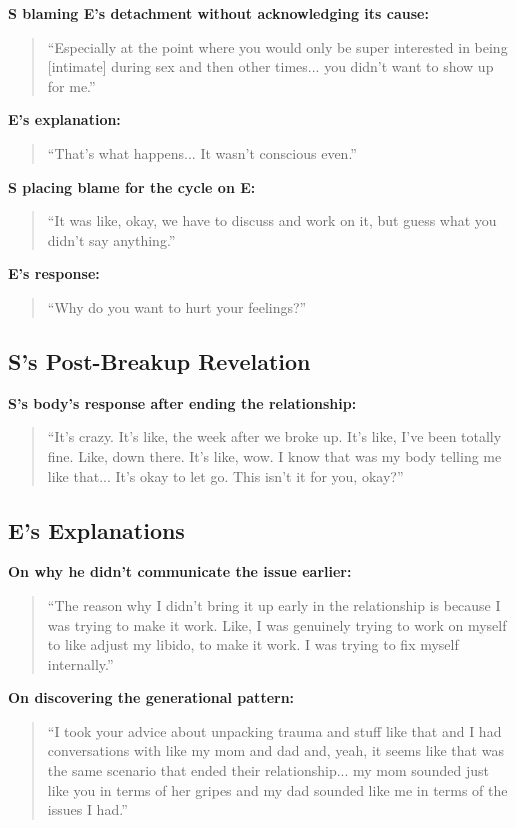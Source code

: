 \documentclass[12pt, letterpaper]{article}
\begin{document}
\textbf{S blaming E's detachment without acknowledging its cause:}
\begin{quote}
``Especially at the point where you would only be super interested in being [intimate] during sex and then other times... you didn't want to show up for me.''
\end{quote}

\textbf{E's explanation:}
\begin{quote}
``That's what happens... It wasn't conscious even.''
\end{quote}

\textbf{S placing blame for the cycle on E:}
\begin{quote}
``It was like, okay, we have to discuss and work on it, but guess what you didn't say anything.''
\end{quote}

\textbf{E's response:}
\begin{quote}
``Why do you want to hurt your feelings?''
\end{quote}

\subsection{S's Post-Breakup Revelation}

\textbf{S's body's response after ending the relationship:}
\begin{quote}
``It's crazy. It's like, the week after we broke up. It's like, I've been totally fine. Like, down there. It's like, wow. I know that was my body telling me like that... It's okay to let go. This isn't it for you, okay?''
\end{quote}

\subsection{E's Explanations}

\textbf{On why he didn't communicate the issue earlier:}
\begin{quote}
``The reason why I didn't bring it up early in the relationship is because I was trying to make it work. Like, I was genuinely trying to work on myself to like adjust my libido, to make it work. I was trying to fix myself internally.''
\end{quote}

\textbf{On discovering the generational pattern:}
\begin{quote}
``I took your advice about unpacking trauma and stuff like that and I had conversations with like my mom and dad and, yeah, it seems like that was the same scenario that ended their relationship... my mom sounded just like you in terms of her gripes and my dad sounded like me in terms of the issues I had.''
\end{quote}
\end{document}
